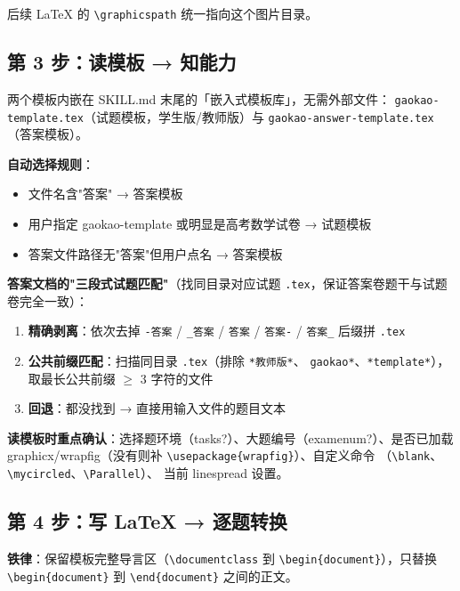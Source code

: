 \documentclass[11pt,a4paper]{ctexart}
\begin{document}
后续 LaTeX 的 \texttt{\textbackslash graphicspath} 统一指向这个图片目录。

\subsection{第 3 步：读模板 → 知能力}

两个模板内嵌在 SKILL.md 末尾的「嵌入式模板库」，无需外部文件：
\texttt{gaokao-template.tex}（试题模板，学生版/教师版）与
\texttt{gaokao-answer-template.tex}（答案模板）。

\textbf{自动选择规则}：

\begin{itemize}
  \item 文件名含"答案" → 答案模板
  \item 用户指定 gaokao-template 或明显是高考数学试卷 → 试题模板
  \item 答案文件路径无"答案"但用户点名 → 答案模板
\end{itemize}

\textbf{答案文档的"三段式试题匹配"}（找同目录对应试题 \texttt{.tex}，保证答案卷题干与试题卷完全一致）：

\begin{enumerate}
  \item \textbf{精确剥离}：依次去掉 \texttt{-答案} / \texttt{\_答案} / \texttt{答案} /
        \texttt{答案-} / \texttt{答案\_} 后缀拼 \texttt{.tex}
  \item \textbf{公共前缀匹配}：扫描同目录 \texttt{.tex}（排除 \texttt{*教师版*}、
        \texttt{gaokao*}、\texttt{*template*}），取最长公共前缀 $\geq$ 3 字符的文件
  \item \textbf{回退}：都没找到 → 直接用输入文件的题目文本
\end{enumerate}

\textbf{读模板时重点确认}：选择题环境（tasks?）、大题编号（examenum?）、是否已加载
graphicx/wrapfig（没有则补 \texttt{\textbackslash usepackage\{wrapfig\}}）、自定义命令
（\texttt{\textbackslash blank}、\texttt{\textbackslash mycircled}、\texttt{\textbackslash Parallel}）、
当前 linespread 设置。

\subsection{第 4 步：写 LaTeX → 逐题转换}

\textbf{铁律}：保留模板完整导言区（\texttt{\textbackslash documentclass} 到
\texttt{\textbackslash begin\{document\}}），只替换 \texttt{\textbackslash begin\{document\}}
到 \texttt{\textbackslash end\{document\}} 之间的正文。
\end{document}
